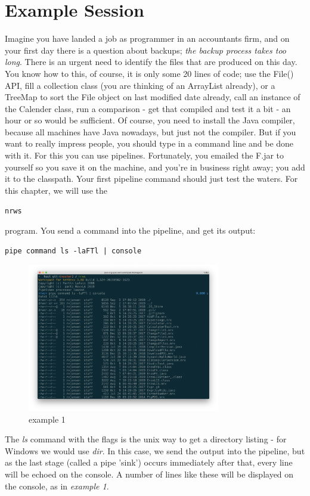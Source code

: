 \chapter{Example Session}
Imagine you have landed a job as programmer in an accountants firm,
and on your first day there is a question about backups; \emph{the backup
process takes too long}. There is an urgent need to identify the files that are produced on this day. You know how to this, of course, it is only some 20 lines of code; use the File() API, fill a collection class (you are thinking of an ArrayList already), or a TreeMap to sort the File object on last modified date already, call an instance of the Calender class, run a comparison - get that compiled and test it a bit - an hour or so would be sufficient. Of course, you need to install the Java compiler, because all machines have Java nowadays, but just not the compiler.
But if you want to really impress people, you should type in a command line and be done with it. For this you can use \nr{} pipelines. Fortunately, you emailed the \nr{}F.jar to yourself so you save it on the machine, and you're in business right away; you add it to the classpath.
Your first pipeline command should just test the waters. For this
chapter, we will use the \begin{alltt}nrws\end{alltt} program. You send a
command into the pipeline, and get its output:
\begin{lstlisting}
pipe command ls -laFTl | console
\end{lstlisting}
\begin{figure}[H]
  \includegraphics[width=0.75\textwidth]{images/example1.png}
  \caption{example 1}
  \label{fig:example1}
\end{figure}

The \emph{ls} command with the flags is the unix way to get a
directory listing - for Windows we would use \emph{dir}. In this case, we send the output into the pipeline, but as the last stage (called a pipe 'sink') occurs immediately after that, every line will be echoed on the console.
A number of lines like these will be displayed on the console, as in
\emph{example 1}.

